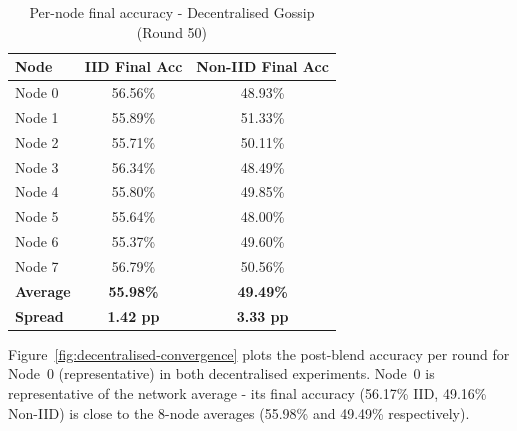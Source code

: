 \documentclass[12pt]{report}
\begin{document}
\begin{table}[H]
\centering
\begin{tabular}{lcc}
\toprule
\textbf{Node} & \textbf{IID Final Acc} & \textbf{Non-IID Final Acc} \\
\midrule
Node 0 & 56.56\% & 48.93\% \\
Node 1 & 55.89\% & 51.33\% \\
Node 2 & 55.71\% & 50.11\% \\
Node 3 & 56.34\% & 48.49\% \\
Node 4 & 55.80\% & 49.85\% \\
Node 5 & 55.64\% & 48.00\% \\
Node 6 & 55.37\% & 49.60\% \\
Node 7 & 56.79\% & 50.56\% \\
\midrule
\textbf{Average} & \textbf{55.98\%} & \textbf{49.49\%} \\
\textbf{Spread}  & \textbf{1.42 pp} & \textbf{3.33 pp} \\
\bottomrule
\end{tabular}
\vspace{0.5cm}
\caption{Per-node final accuracy - Decentralised Gossip (Round 50)}
\label{tab:decentralised-nodes}
\end{table}

Figure~\ref{fig:decentralised-convergence} plots the post-blend
accuracy per round for Node~0 (representative) in both decentralised
experiments. Node~0 is representative of the network average -
its final accuracy (56.17\% IID, 49.16\% Non-IID) is close to the
8-node averages (55.98\% and 49.49\% respectively).
 
\end{document}
